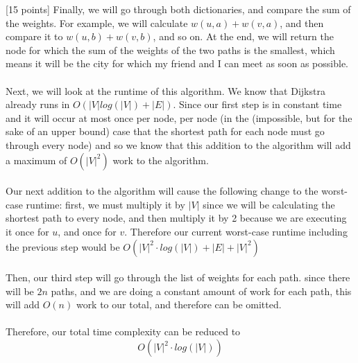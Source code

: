 \documentclass[12pt]{article}
\newcounter{ques}
\newenvironment{question}{\stepcounter{ques}{\noindent\bf Question \arabic{ques}:}}{\vspace{5mm}}
\begin{document}
\begin{question}[15 points]
Finally, we will go through both dictionaries, and compare the sum of the weights. For example, we will calculate $w(u,a) +w(v,a)$, and then compare it to $w(u,b)+w(v,b)$, and so on. At the end, we will return the node for which the sum of the weights of the two paths is the smallest, which means it will be the city for which my friend and I can meet as soon as possible.\\\\

Next, we will look at the runtime of this algorithm.
We know that Dijkstra already runs in $O(|V|log(|V|)+|E|)$. Since our first step is in constant time and it will occur at most once per node, per node (in the (impossible, but for the sake of an upper bound) case that the shortest path for each node must go through every node) and so we know that this addition to the algorithm will add a maximum of $O(|V|^2)$ work to the algorithm.\\\\
Our next addition to the algorithm will cause the following change to the worst-case runtime: first, we must multiply it by $|V|$ since we will be calculating the shortest path to every node, and then multiply it by 2 because we are executing it once for $u$, and once for $v$. Therefore our current worst-case runtime including the previous step would be $O(|V|^2\cdot log(|V|)+|E|+|V|^2)$\\\\
Then, our third step will go through the list of weights for each path. since there will be $2n$ paths, and we are doing a constant amount of work for each path, this will add $O(n)$ work to our total, and therefore can be omitted.\\\\
Therefore, our total time complexity can be reduced to
$$O(|V|^2\cdot log(|V|))$$



\end{question}
\end{document}
